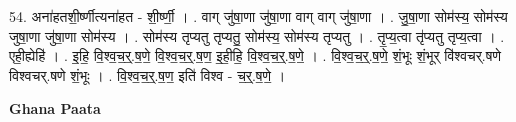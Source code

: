 \documentclass[17pt]{extarticle}
\begin{document}
54. अना॑हतशी॒र्ष्णीत्यना॑हत - शी॒र्ष्णी॒ । . वाग् जु॑षा॒णा जु॑षा॒णा वाग् वाग् जु॑षा॒णा । . जु॒षा॒णा सोम॑स्य॒ सोम॑स्य जुषा॒णा जु॑षा॒णा सोम॑स्य । . सोम॑स्य तृप्यतु तृप्यतु॒ सोम॑स्य॒ सोम॑स्य तृप्यतु । . तृ॒प्य॒त्वा तृ॑प्यतु तृप्य॒त्वा । . एही॒ह्येहि॑ । . इ॒हि॒ वि॒श्व॒च॒र्॒.ष॒णे॒ वि॒श्व॒च॒र्॒.ष॒ण॒ इ॒ही॒हि॒ वि॒श्व॒च॒र्॒.ष॒णे॒ । . वि॒श्व॒च॒र्॒.ष॒णे॒ शं॒भूः शं॒भूर् वि॑श्वचर्.षणे विश्वचर्.षणे शं॒भूः । . वि॒श्व॒च॒र्॒.ष॒ण॒ इति॑ विश्व - च॒र्॒.ष॒णे॒ । \newline

\textbf{Ghana Paata } \newline
\end{document}
